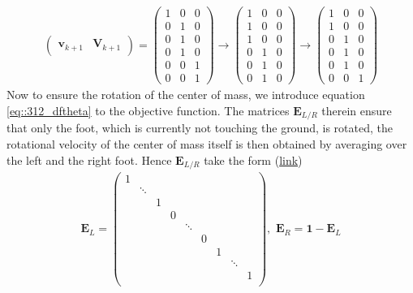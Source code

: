 \begin{align}
	\left(
	\begin{array}{c|c}
	\bm{v}_{k+1} & \bm{V}_{k+1}
	\end{array} 
	\right) =
	\left(
	\begin{array}{c|cc}
	1 & 0 & 0 \\
	0 & 1 & 0 \\
	0 & 1 & 0 \\ 
	0 & 1 & 0 \\
	0 & 0 & 1 \\
	0 & 0 & 1
	\end{array}\right) \rightarrow
	\left(
	\begin{array}{c|cc}
	1 & 0 & 0 \\
	1 & 0 & 0 \\
	1 & 0 & 0 \\ 
	0 & 1 & 0 \\
	0 & 1 & 0 \\
	0 & 1 & 0
	\end{array}\right) \rightarrow
	\left(
	\begin{array}{c|cc}
	1 & 0 & 0 \\
	1 & 0 & 0 \\
	0 & 1 & 0 \\ 
	0 & 1 & 0 \\
	0 & 1 & 0 \\
	0 & 0 & 1
	\end{array}\right)
\end{align}
Now to ensure the rotation of the center of mass, we introduce equation \ref{eq::312_dftheta} to the objective function. The matrices $\bm{E}_{L/R}$ therein ensure that only the foot, which is currently not touching the ground, is rotated, the rotational velocity of the center of mass itself is then obtained by averaging over the left and the right foot. Hence $\bm{E}_{L/R}$ take the form (\href{https://github.com/mhubii/nmpc_pattern_generator/blob/5a213044c927dc6aac9f7e32ce1e5fb472cd67bb/libs/pattern_generator/src/base_generator.cpp#L1281}{link})
\begin{align}
	\bm{E}_L = \begin{pmatrix}
	1&&&&&&&& \\
	&\ddots&&&&&&& \\
	&&1&&&&&& \\
	&&&0&&&&& \\
	&&&&\ddots&&&& \\
	&&&&&0&&& \\
	&&&&&&1&& \\
	&&&&&&&\ddots& \\
	&&&&&&&&1 \\
	\end{pmatrix},\,\,
	\bm{E}_R = \bm{1} - \bm{E}_L
\end{align}
